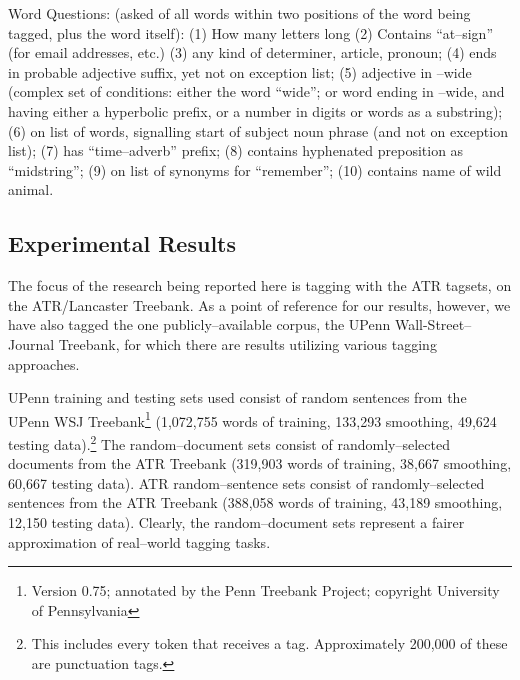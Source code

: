Word Questions: (asked of all words within two positions of the word
being tagged, plus the word itself): (1) How many letters long (2)
Contains ``at--sign'' (for email addresses, etc.) (3) any kind of
determiner, article, pronoun; (4) ends in probable adjective suffix,
yet not on exception list; (5) adjective in --wide (complex set of
conditions: either the word ``wide''; or word ending in --wide, and
having either a hyperbolic prefix, or a number in digits or words as a
substring); (6) on list of words, signalling start of subject noun
phrase (and not on exception list); (7) has ``time--adverb'' prefix;
(8) contains hyphenated preposition as ``midstring''; (9) on list of
synonyms for ``remember''; (10) contains name of wild animal.


\pagebreak

\subsection{Experimental Results}

\begin{sloppypar}
The\hspace{0.3mm} focus\hspace{0.3mm} of\hspace{0.3mm}
the\hspace{0.3mm} research\hspace{0.3mm} being\hspace{0.3mm}
reported\hspace{0.3mm} her\hspace{0.3mm}e\hspace{0.3mm}
is\hspace{0.3mm} tagging\hspace{0.3mm} with\hspace{0.3mm}
the\hspace{0.3mm} ATR\hspace{0.3mm}
tagsets,\hspace{0.3mm} on\hspace{0.3mm} the ATR/Lancaster Treebank.\hspace{1mm} As a point of reference for
our results, however, we have also tagged the one publicly--available
corpus, the UPenn Wall-Street--Journal Treebank, for which there are
results utilizing various tagging approaches.
\end{sloppypar}


UPenn training and testing sets used consist of random sentences from
the UPenn WSJ Treebank\footnote{Version 0.75;
annotated by the Penn Treebank Project; copyright University of
Pennsylvania} (1,072,755 words of training, 133,293 smoothing, 49,624
testing data).\footnote{ This includes every token that receives a
tag.  Approximately 200,000 of these are punctuation tags.} The
random--document sets consist of randomly--selected documents from the
ATR Treebank (319,903 words of training, 38,667 smoothing, 60,667
testing data).  ATR random--sentence sets consist of
randomly--selected sentences from the ATR Treebank (388,058 words of
training, 43,189 smoothing, 12,150 testing data).  Clearly, the
random--document sets represent a fairer approximation of real--world
tagging tasks.

